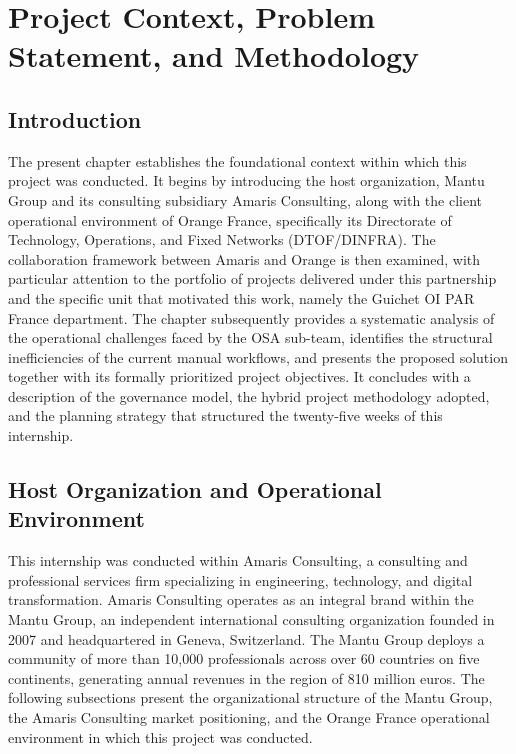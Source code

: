 \chapter{Project Context, Problem Statement, and Methodology}

\section*{Introduction}

The present chapter establishes the foundational context within which this project was conducted. It begins by introducing the host organization, Mantu Group and its consulting subsidiary Amaris Consulting, along with the client operational environment of Orange France, specifically its Directorate of Technology, Operations, and Fixed Networks (DTOF/DINFRA). The collaboration framework between Amaris and Orange is then examined, with particular attention to the portfolio of projects delivered under this partnership and the specific unit that motivated this work, namely the Guichet OI PAR France department. The chapter subsequently provides a systematic analysis of the operational challenges faced by the OSA sub-team, identifies the structural inefficiencies of the current manual workflows, and presents the proposed solution together with its formally prioritized project objectives. It concludes with a description of the governance model, the hybrid project methodology adopted, and the planning strategy that structured the twenty-five weeks of this internship.

\section{Host Organization and Operational Environment}

This internship was conducted within Amaris Consulting, a consulting and professional services firm specializing in engineering, technology, and digital transformation. Amaris Consulting operates as an integral brand within the Mantu Group, an independent international consulting organization founded in 2007 and headquartered in Geneva, Switzerland. The Mantu Group deploys a community of more than 10,000 professionals across over 60 countries on five continents, generating annual revenues in the region of 810 million euros. The following subsections present the organizational structure of the Mantu Group, the Amaris Consulting market positioning, and the Orange France operational environment in which this project was conducted.

